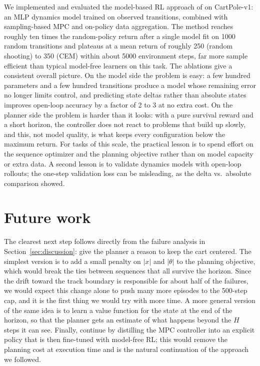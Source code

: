 \documentclass{article}
\begin{document}
We implemented and evaluated the model-based RL approach of \citet{nagabandi2018} on CartPole-v1: an MLP dynamics model trained on observed transitions, combined with sampling-based MPC and on-policy data aggregation. The method reaches roughly ten times the random-policy return after a single model fit on 1000 random transitions and plateaus at a mean return of roughly 250 (random shooting) to 350 (CEM) within about 5000 environment steps, far more sample efficient than typical model-free learners on this task. The ablations give a consistent overall picture. On the model side the problem is easy: a few hundred parameters and a few hundred transitions produce a model whose remaining error no longer limits control, and predicting state deltas rather than absolute states improves open-loop accuracy by a factor of 2 to 3 at no extra cost. On the planner side the problem is harder than it looks: with a pure survival reward and a short horizon, the controller does not react to problems that build up slowly, and this, not model quality, is what keeps every configuration below the maximum return. For tasks of this scale, the practical lesson is to spend effort on the sequence optimizer and the planning objective rather than on model capacity or extra data. A second lesson is to validate dynamics models with open-loop rollouts; the one-step validation loss can be misleading, as the delta vs.\ absolute comparison showed.

\section{Future work}

The clearest next step follows directly from the failure analysis in Section~\ref{sec:discussion}: give the planner a reason to keep the cart centered. The simplest version is to add a small penalty on $|x|$ and $|\theta|$ to the planning objective, which would break the ties between sequences that all survive the horizon. Since the drift toward the track boundary is responsible for about half of the failures, we would expect this change alone to push many more episodes to the 500-step cap, and it is the first thing we would try with more time. A more general version of the same idea is to learn a value function for the state at the end of the horizon, so that the planner gets an estimate of what happens beyond the $H$ steps it can see. Finally, \citet{nagabandi2018} continue by distilling the MPC controller into an explicit policy that is then fine-tuned with model-free RL; this would remove the planning cost at execution time and is the natural continuation of the approach we followed.
\end{document}
